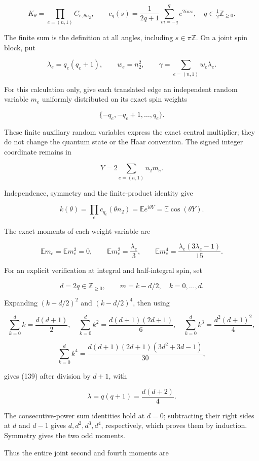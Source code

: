 \documentclass[
  11pt,
]{article}
\begin{document}
\[
 K_\theta=\prod_{e=(n,1)}C_{e,\theta n_2},\qquad
 c_q(s)=\frac1{2q+1}\sum_{m=-q}^{q}e^{2ims},
 \quad q\in\tfrac12\mathbb Z_{\ge0}.
\]

The finite sum is the definition at all angles, including
\(s\in\pi\mathbb Z\). On a joint spin block, put

\[
 \lambda_e=q_e(q_e+1),\qquad w_e=n_2^2,\qquad
 \gamma=\sum_{e=(n,1)}w_e\lambda_e.
\]

For this calculation only, give each translated edge an independent
random variable \(m_e\) uniformly distributed on its exact spin weights

\[
 \{-q_e,-q_e+1,\ldots,q_e\}.
\]

These finite auxiliary random variables express the exact central
multiplier; they do not change the quantum state or the Haar convention.
The signed integer coordinate remains in

\[
 Y=2\sum_{e=(n,1)}n_2m_e.
\]

Independence, symmetry and the finite-product identity give

\[
 k(\theta)=\prod_ec_{q_e}(\theta n_2)
 =\mathbb E e^{i\theta Y}=\mathbb E\cos(\theta Y).
\tag{138}
\]

The exact moments of each weight variable are

\[
 \mathbb E m_e=\mathbb E m_e^3=0,\qquad
 \mathbb E m_e^2=\frac{\lambda_e}{3},\qquad
 \mathbb E m_e^4=\frac{\lambda_e(3\lambda_e-1)}{15}.
\tag{139}
\]

For an explicit verification at integral and half-integral spin, set

\[
 d=2q\in\mathbb Z_{\ge0},\qquad m=k-d/2,
 \quad k=0,\ldots,d.
\]

Expanding \((k-d/2)^2\) and \((k-d/2)^4\), then using

\[
 \sum_{k=0}^dk=\frac{d(d+1)}2,\quad
 \sum_{k=0}^dk^2=\frac{d(d+1)(2d+1)}6,\quad
 \sum_{k=0}^dk^3=\frac{d^2(d+1)^2}4,
\]

\[
 \sum_{k=0}^dk^4
 =\frac{d(d+1)(2d+1)(3d^2+3d-1)}{30},
\]

gives (139) after division by \(d+1\), with

\[
 \lambda=q(q+1)=\frac{d(d+2)}4.
\]

The consecutive-power sum identities hold at \(d=0\); subtracting their
right sides at \(d\) and \(d-1\) gives \(d,d^2,d^3,d^4\), respectively,
which proves them by induction. Symmetry gives the two odd moments.

Thus the entire joint second and fourth moments are
\end{document}
